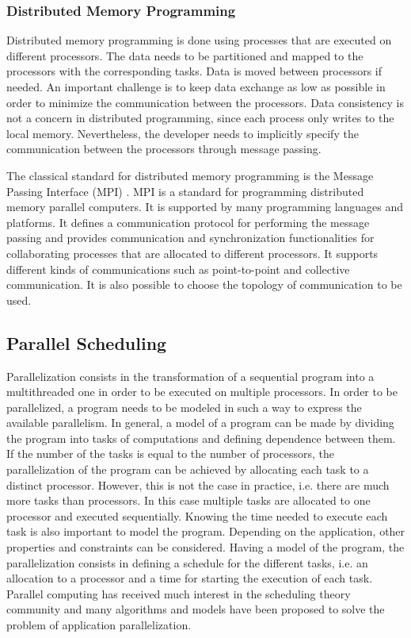 \subsubsection{Distributed Memory Programming}

Distributed memory programming is done using processes that are executed on different processors. The data needs to be partitioned and mapped to the processors with the corresponding tasks. Data is moved between processors if needed. An important challenge is to keep data exchange as low as possible in order to minimize the communication between the processors. Data consistency is not a concern in distributed programming, since each process only writes to the local memory. Nevertheless, the developer needs to implicitly specify the communication between the processors through message passing.  

The classical standard for distributed memory programming is the Message Passing Interface (MPI) \cite{mpi}. MPI is a standard for programming distributed memory parallel computers. It is supported by many programming languages and platforms. It defines a communication protocol for performing the message passing and provides communication and synchronization functionalities for collaborating processes that are allocated to different processors. It supports different kinds of communications such as point-to-point and collective communication. It is also possible to choose the topology of communication to be used.

\subsection{Parallel Scheduling}

Parallelization consists in the transformation of a sequential program into a multithreaded one in order to be executed on multiple processors. In order to be parallelized, a program needs to be modeled in such a way to express the available parallelism. In general, a model of a program can be made by dividing the program into tasks of computations and defining dependence between them. 
If the number of the tasks is equal to the number of processors, the parallelization of the program can be achieved by allocating each task to a distinct processor. However, this is not the case in practice, i.e. there are much more tasks than processors. In this case multiple tasks are allocated to one processor and executed sequentially.  
Knowing the time needed to execute each task is also important to model the program. Depending on the application, other properties and constraints can be considered. Having a model of the program, the parallelization consists in defining a schedule for the different tasks, i.e. an allocation to a processor and a time for starting the execution of each task. Parallel computing has received much interest in the scheduling theory community and many algorithms and models have been proposed to solve the problem of application parallelization.   


